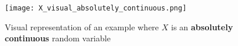             \begin{figure}[h]
                \centering
                \texttt{[image: X\_visual\_absolutely\_continuous.png]}
                \caption{Visual representation of an example where \(X\) is an \textbf{absolutely continuous} random variable}
                \label{fig:X_visual_absolutely_continuous}
            \end{figure}

            